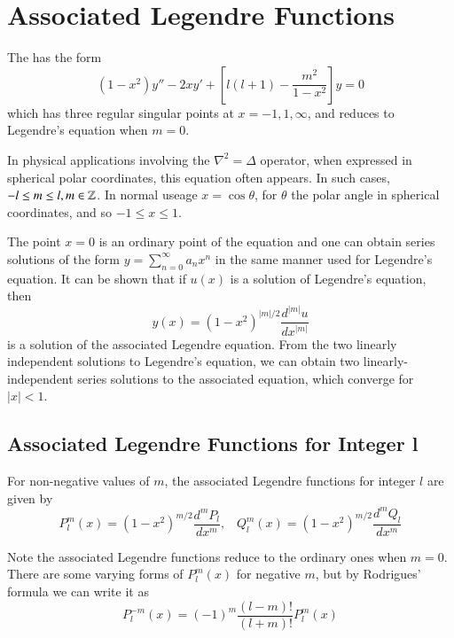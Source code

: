 \documentclass[12pt, a4paper, oneside, openright, titlepage]{book}
\begin{document}
\section{Associated Legendre Functions}

\begin{defn}
    The  has the form \begin{equation}
        (1-x^2)y'' - 2xy' + \left[l(l+1) - \frac{m^2}{1-x^2}\right]y = 0
    \end{equation}
    which has three regular singular points at $x = -1, 1, \infty$, and reduces to Legendre's equation when $m = 0$.
\end{defn}

In physical applications involving the $\nabla^2 = \Delta$ operator, when expressed in spherical polar coordinates, this equation often appears. In such cases, $-l \leq m \leq l, m \in \mathbb Z$. In normal useage $x = \cos\theta$, for $\theta$ the polar angle in spherical coordinates, and so $-1 \leq x\leq 1$.

The point $x = 0$ is an ordinary point of the equation and one can obtain series solutions of the form $y = \sum_{n=0}^{\infty}a_nx^n$ in the same manner used for Legendre's equation. It can be shown that if $u(x)$ is a solution of Legendre's equation, then \begin{equation}
    y(x) = (1-x^2)^{|m|/2}\frac{d^{|m|}u}{dx^{|m|}}
\end{equation}
is a solution of the associated Legendre equation. From the two linearly independent solutions to Legendre's equation, we can obtain two linearly-independent series solutions to the associated equation, which converge for $|x| <1$.

\subsection{Associated Legendre Functions for Integer l}

For non-negative values of $m$, the associated Legendre functions for integer $l$ are given by \begin{equation}
    P_l^m(x) = (1-x^2)^{m/2}\frac{d^mP_l}{dx^m},\;\;\;Q_l^m(x) = (1-x^2)^{m/2}\frac{d^mQ_l}{dx^m}
\end{equation}

Note the associated Legendre functions reduce to the ordinary ones when $m = 0$. There are some varying forms of $P_l^m(x)$ for negative $m$, but by Rodrigues' formula we can write it as \begin{equation}
    P_l^{-m}(x) = (-1)^m\frac{(l-m)!}{(l+m)!}P_l^m(x)
\end{equation}
\end{document}
